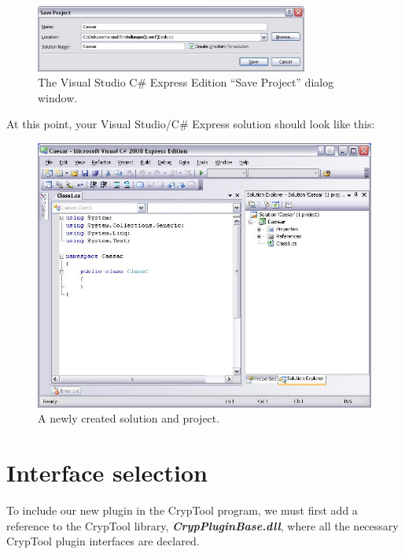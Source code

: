 \begin{figure}[h!]
	\centering
		\includegraphics[width=0.80\textwidth]{figures/save_solution_csharp_express.JPG}
	\caption{The Visual Studio C\# Express Edition ``Save Project'' dialog window.}
	\label{fig:save_solution_csharp_express}
\end{figure}

\noindent At this point, your Visual Studio\slash C\# Express solution should look like this:

\begin{figure}[h!]
	\centering
		\includegraphics[width=1.00\textwidth]{figures/solution_start_up.jpg}
	\caption{A newly created solution and project.}
	\label{fig:solution_start_up}
\end{figure}
\clearpage

\section{Interface selection}
\label{sec:InterfaceSelection}

To include our new plugin in the CrypTool program, we must first add a reference to the CrypTool library, \textbf{\textit{CrypPluginBase.dll}}, where all the necessary CrypTool plugin interfaces are declared.

